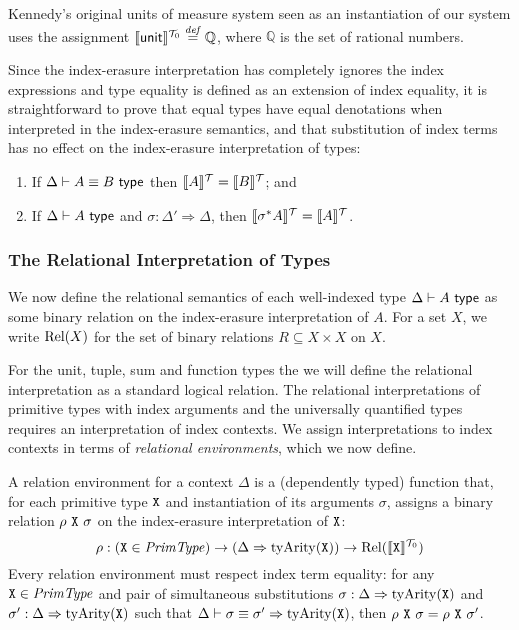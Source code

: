 \begin{example} Kennedy's original units of measure
  system seen as an instantiation of our system uses the assignment
  $\llbracket \mathsf{unit} \rrbracket^{\mathcal{T}_0} \stackrel{\mathit{def}}= \mathbb{Q}$, where
  $\mathbb{Q}$ is the set of rational numbers.
\end{example}

Since the index-erasure interpretation has completely ignores the
index expressions and type equality is defined as an extension of
index equality, it is straightforward to prove that equal types have
equal denotations when interpreted in the index-erasure semantics, and
that substitution of index terms has no effect on the index-erasure
interpretation of types:
\begin{lemma}\label{lem:tyeqsubst-erasure}
  \begin{enumerate}
  \item If $\Delta \vdash A \equiv B \textsf{ type}$ then $\llbracket A \rrbracket^{\mathcal{T}} =
    \llbracket B \rrbracket^{\mathcal{T}}$; and
  \item If $\Delta \vdash A \textsf{ type}$ and $\sigma : \Delta' \Rightarrow
    \Delta$, then $\llbracket \sigma^*A \rrbracket^{\mathcal{T}} = \llbracket A \rrbracket^{\mathcal{T}}$.
  \end{enumerate}
\end{lemma}

\subsubsection{The Relational Interpretation of Types}
\label{sec:relational-semantics}

We now define the relational semantics of each well-indexed type
$\Delta \vdash A \textsf{ type}$ as some binary relation on the index-erasure
interpretation of $A$. For a set $X$, we write $\mathrm{Rel}(X)$ for the set
of binary relations $R \subseteq X \times X$ on $X$.

For the unit, tuple, sum and function types the we will define the
relational interpretation as a standard logical relation. The
relational interpretations of primitive types with index arguments and
the universally quantified types requires an interpretation of index
contexts. We assign interpretations to index contexts in terms of
\emph{relational environments}, which we now define.

A relation environment for a context $\Delta$ is a
(dependently typed) function that, for each primitive type
$\texttt{X}$ and instantiation of its arguments $\sigma$, assigns a
binary relation $\rho\ \tyPrimNm{X}\ \sigma$ on the index-erasure
interpretation of $\texttt{X}$:
\begin{displaymath}
  \rho : (\texttt{X} \in \mathit{PrimType}) \to (\Delta \Rightarrow \mathrm{tyArity}(\texttt{X})) \to \mathrm{Rel}(\llbracket \texttt{X} \rrbracket^{\mathcal{T}_0})
\end{displaymath}
Every relation environment must respect index term equality: for any
$\texttt{X} \in \mathit{PrimType}$ and pair of simultaneous substitutions
$\sigma : \Delta \Rightarrow \mathrm{tyArity}(\texttt{X})$ and $\sigma'
: \Delta \Rightarrow \mathrm{tyArity}(\texttt{X})$ such that $\Delta
\vdash \sigma \equiv \sigma' \Rightarrow \mathrm{tyArity}(\texttt{X})$, %
then $\rho\ \tyPrimNm{X}\ \sigma = \rho\ \tyPrimNm{X}\ \sigma'$.

